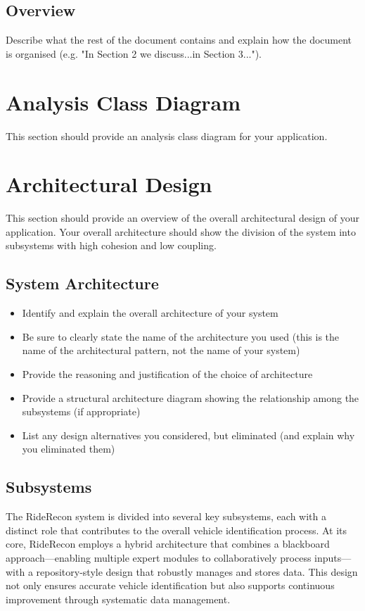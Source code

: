 \documentclass[]{article}
\begin{document}

\subsection{Overview}
\label{sub:overview}
Describe what the rest of the document contains and explain how the document is organised (e.g. "In Section 2 we discuss...in Section 3...").



\section{Analysis Class Diagram}
\label{sec:analysis_class_diagram}
This section should provide an analysis class diagram for your application.


\section{Architectural Design}
\label{sec:architectural_design}
This section should provide an overview of the overall architectural design of your application. Your overall architecture should show the division of the system into subsystems with high cohesion and low coupling.

\subsection{System Architecture}
\label{sub:system_architecture}
\begin{itemize}
	\item Identify and explain the overall architecture of your system
	\item Be sure to clearly state the name of the architecture you used (this is the name of the architectural pattern, not the name of your system)
	\item Provide the reasoning and justification of the choice of architecture
	\item Provide a structural architecture diagram showing the relationship among the subsystems (if appropriate)
	\item List any design alternatives you considered, but eliminated (and explain why you eliminated them)
\end{itemize}

\subsection{Subsystems}
\label{sub:subsystems}
The RideRecon system is divided into several key subsystems, each with a distinct role that contributes to the overall vehicle identification process. At its core, RideRecon employs a hybrid architecture that combines a blackboard approach—enabling multiple expert modules to collaboratively process inputs—with a repository-style design that robustly manages and stores data. This design not only ensures accurate vehicle identification but also supports continuous improvement through systematic data management.\\
\end{document}
